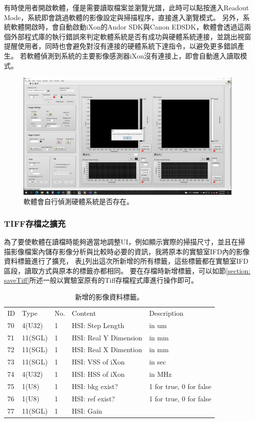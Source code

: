 \documentclass[12pt]{article}
\begin{document}
有時使用者開啟軟體，僅是需要讀取檔案並瀏覽光譜，此時可以點按進入Readout Mode，系統即會跳過軟體的影像設定與掃描程序，直接進入瀏覽模式。
另外，系統軟體開啟時，會自動啟動iXon的Andor SDK與Canon EDSDK，軟體會透過這兩個外部程式庫的執行錯誤來判定軟體系統是否有成功與硬體系統連接，並跳出視窗提醒使用者，同時也會避免對沒有連接的硬體系統下達指令，以避免更多錯誤產生。
若軟體偵測到系統的主要影像感測器iXon沒有連接上，即會自動進入讀取模式。
\begin{figure}[ht]
    \centering
    \includegraphics[width=\linewidth]{detectHW.jpeg}
    \caption{軟體會自行偵測硬體系統是否存在。}
    \label{figure: detect hardware}
\end{figure}
\subsubsection{TIFF存檔之擴充}
為了要使軟體在讀檔時能夠適當地調整UI，例如顯示實際的掃描尺寸，並且在掃描影像檔案內儲存影像分析與比較時必要的資訊，我將原本的實驗室IFD內的影像資料標籤進行了擴充，
表\ref{tab: new tag}列出這次所新增的所有標籤，這些標籤都在實驗室IFD區段，讀取方式與原本的標籤亦都相同。
要在存檔時新增標籤，可以如節\ref{section: saveTiff}所述一般以實驗室原有的Tiff存檔程式庫進行操作即可。
\begin{table}[ht]
    \begin{tabular}{lllll}
        ID & Type    & No. & Content               & Description             \\
        70 & 4(U32)  & 1   & HSI: Step Length      & in um                   \\
        71 & 11(SGL) & 1   & HSI: Real Y Dimension & in mm                   \\
        72 & 11(SGL) & 1   & HSI: Real X Dimention & in mm                   \\
        73 & 11(SGL) & 1   & HSI: VSS of iXon      & in sec                  \\
        74 & 4(U32)  & 1   & HSI: HSS of iXon      & in MHz                  \\
        75 & 1(U8)   & 1   & HSI: bkg exist?       & 1 for true, 0 for false \\
        76 & 1(U8)   & 1   & HSI: ref exist?       & 1 for true, 0 for false \\
        77 & 11(SGL) & 1   & HSI: Gain             &
    \end{tabular}
    \caption{新增的影像資料標籤。}
    \label{tab: new tag}
\end{table}
\end{document}
